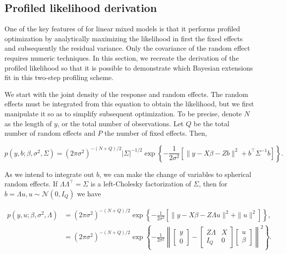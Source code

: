\documentclass[article,shortnames]{jss}
\begin{document}
\subsection{Profiled likelihood derivation}

One of the key features of  for linear mixed models is that
it performs profiled optimization by analytically maximizing the
likelihood in first the fixed
effects and subsequently the residual variance. Only the covariance of the random
effect requires numeric techniques. In this section, we recreate
the derivation of the profiled likelihood so that it is possible to
demonstrate which Bayesian extensions fit in this two-step profiling scheme.

We start with the joint density of the response and random
effects. The random effects must be integrated from this equation to
obtain the likelihood, but
we first manipulate it so
as to simplify subsequent optimization. To be precise, denote $N$ as the length of $y$, or the
total number of observations. Let $Q$ be the total number of random effects
and $P$ the number of fixed effects. Then,

\begin{equation*}
  p(y, b; \beta, \sigma^2, \Sigma) = (2\pi\sigma^2)^{-(N+Q)/2}
  |\Sigma|^{-1/2} 
  \exp\left\{-\frac{1}{2\sigma^2}\left[ \|y - X\beta - Zb\|^2 + b^\top
      \Sigma^{-1} b\right]\right\}.
\end{equation*}

As we intend to integrate out $b$, we can make the change of variables
to spherical random effects. If $\Lambda\Lambda^\top = \Sigma$ is
a left-Cholesky factorization of $\Sigma$, then for $b = \Lambda u, u
\sim \mathcal{N}(0, I_Q)$ we have

\begin{align}
  \label{eq:jointDensity}
  p(y, u; \beta, \sigma^2, \Lambda) & = (2\pi\sigma^2)^{-(N+Q)/2} 
  \exp\left\{-\frac{1}{2\sigma^2}\left[\|y - X\beta - Z\Lambda u\|^2 +
      \|u\|^2\right]\right\}, \nonumber \\
    & = (2\pi\sigma^2)^{-(N+Q)/2} 
    \exp\left\{-\frac{1}{2\sigma^2}\left\|\begin{bmatrix}y \\ 0 \end{bmatrix}
    -\begin{bmatrix}Z\Lambda & X \\ I_Q &
      0 \end{bmatrix}\begin{bmatrix} u \\ \beta \end{bmatrix}\right\|^2\right\}.
\end{align}
\end{document}
